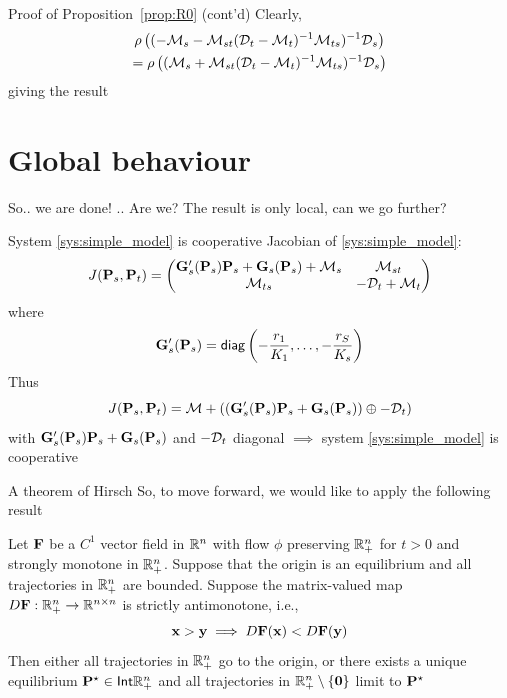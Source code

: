 \documentclass[aspectratio=169]{beamer}
\begin{document}
\begin{frame}{Proof of Proposition~\ref{prop:R0} (cont'd)}
		Clearly,
		\begin{multline*}
			\rho\left(
			(-\mathcal{M}_s-\mathcal{M}_{st}(\mathcal{D}_t-\mathcal{M}_t)^{-1}\mathcal{M}_{ts})^{-1}\mathcal{D}_s
			\right) \\
			=
			\rho\left(
			(\mathcal{M}_s+\mathcal{M}_{st}(\mathcal{D}_t-\mathcal{M}_t)^{-1}\mathcal{M}_{ts})^{-1}\mathcal{D}_s
			\right)
		\end{multline*}
		giving the result
\end{frame}

\section{Global behaviour}
\begin{frame}{So..}
	we are done!
	\vfill
	.. Are we? The result is only local, can we go further?
\end{frame}

\begin{frame}{System \eqref{sys:simple_model} is cooperative}
	Jacobian of \eqref{sys:simple_model}:
	\begin{equation}\label{eq:Jacobian_anywhere}
	J(\mathbf{P}_s,\mathbf{P}_t) = 
	\begin{pmatrix}
	\mathbf{G}_s'(\mathbf{P}_s)\mathbf{P}_s+\mathbf{G}_s(\mathbf{P}_s)+\mathcal{M}_s & \mathcal{M}_{st} \\
	\mathcal{M}_{ts} & -\mathcal{D}_t+\mathcal{M}_t
	\end{pmatrix}
	\end{equation}
	where
	\[
	\mathbf{G}_s'(\mathbf{P}_s) = \mathsf{diag} \left(-\frac{r_1}{K_1},\ldots,-\frac{r_S}{K_s}\right)
	\]
	\vfill
	Thus
	\[
	J(\mathbf{P}_s,\mathbf{P}_t) = \mathcal{M}+ \left((\mathbf{G}_s'(\mathbf{P}_s)\mathbf{P}_s+\mathbf{G}_s(\mathbf{P}_s))\oplus -\mathcal{D}_t\right)
	\]
	with
	$\mathbf{G}_s'(\mathbf{P}_s)\mathbf{P}_s+\mathbf{G}_s(\mathbf{P}_s)$ and $-\mathcal{D}_t$ diagonal
	\vfill
	$\implies$ system \eqref{sys:simple_model} is cooperative
\end{frame}


\begin{frame}{A theorem of Hirsch}
	So, to move forward, we would like to apply the following result
	\vfill
	\begin{theorem}
		Let $\mathbf{F}$ be a $C^1$ vector field in $\mathbb{R}^n$ with flow $\phi$ preserving $\mathbb{R}_+^n$ for $t>0$ and strongly monotone in $\mathbb{R}_+^n$. 
		Suppose that the origin is an equilibrium and all trajectories in $\mathbb{R}_+^n$ are bounded. Suppose the matrix-valued map $D\mathbf{F}:\mathbb{R}_+^n\to \mathbb{R}^{n\times n}$ is strictly antimonotone, i.e., 
		\[
		\mathbf{x}>\mathbf{y}\implies D\mathbf{F}(\mathbf{x})<D\mathbf{F}(\mathbf{y})
		\]
		\vskip0.5cm
		Then either all trajectories in $\mathbb{R}_+^n$ go to the origin, or there exists a unique equilibrium $\mathbf{P}^\star\in\mathsf{Int}\mathbb{R}_+^n$ and all trajectories in $\IR_+^n\setminus\{\b0\}$ limit to $\mathbf{P}^\star$
	\end{theorem}
\end{frame}
\end{document}

